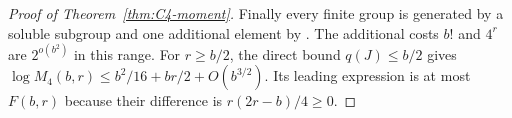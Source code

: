 \begin{proof}[Proof of Theorem~\ref{thm:C4-moment}]
Finally every finite group is generated by a soluble subgroup and one
additional element by \cite[Theorem 8.4]{RoneyDougalTracey2025}.
The additional costs $b!$ and $4^r$ are $2^{o(b^2)}$ in this range.
For $r\geq b/2$, the direct bound $q(J)\leq b/2$ gives
$\log M_4(b,r)\leq b^2/16+br/2+O(b^{3/2})$.
Its leading expression is at most $F(b,r)$ because their difference
is $r(2r-b)/4\geq0$.
\end{proof}
